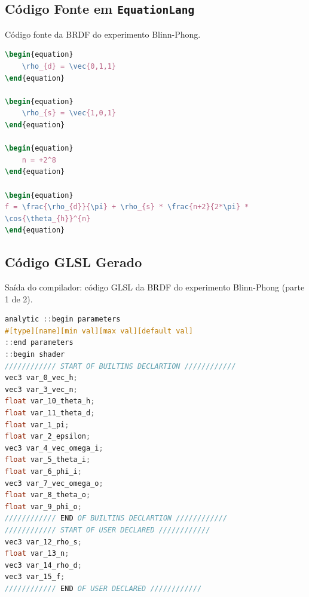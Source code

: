 \subsection{Código Fonte em \texttt{EquationLang}}
\begin{codigo}[H]
    \caption{\small Código fonte da BRDF do experimento Blinn-Phong.}
    \label{cod-blinn-phong-eqlang}
\begin{lstlisting}[language=tex, frame=none, inputencoding=utf8]
\begin{equation}
    \rho_{d} = \vec{0,1,1}
\end{equation}

\begin{equation}
    \rho_{s} = \vec{1,0,1}
\end{equation}

\begin{equation}
    n = +2^8
\end{equation}

\begin{equation}
f = \frac{\rho_{d}}{\pi} + \rho_{s} * \frac{n+2}{2*\pi} *
\cos{\theta_{h}}^{n}
\end{equation}
\end{lstlisting}
\end{codigo}

\subsection{Código GLSL Gerado}
\begin{codigo}[H]
    \caption{\small Saída do compilador: código GLSL da BRDF do experimento Blinn-Phong (parte 1 de 2).}
    \label{cod-blinn-phong-glsl-pt-1}
\begin{lstlisting}[language=C, inputencoding=utf8]
analytic ::begin parameters
#[type][name][min val][max val][default val]
::end parameters
::begin shader
//////////// START OF BUILTINS DECLARTION ////////////
vec3 var_0_vec_h;
vec3 var_3_vec_n;
float var_10_theta_h;
float var_11_theta_d;
float var_1_pi;
float var_2_epsilon;
vec3 var_4_vec_omega_i;
float var_5_theta_i;
float var_6_phi_i;
vec3 var_7_vec_omega_o;
float var_8_theta_o;
float var_9_phi_o;
//////////// END OF BUILTINS DECLARTION ////////////
//////////// START OF USER DECLARED ////////////
vec3 var_12_rho_s;
float var_13_n;
vec3 var_14_rho_d;
vec3 var_15_f;
//////////// END OF USER DECLARED ////////////
\end{lstlisting}
\end{codigo}


